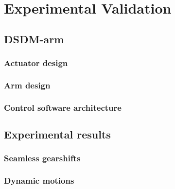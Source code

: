 \chapter{Experimental Validation}
\label{sec:ExperimentalValidation}


\section{DSDM-arm}
\label{sec:DSDMArm}

\subsection{Actuator design}
\label{sec:ActuatorDesign}

\subsection{Arm design}
\label{sec:ArmDesign}

\subsection{Control software architecture}
\label{sec:ControlSoftwareArchitecture}


\section{Experimental results}
\label{sec:ExperimentalResults}

\subsection{Seamless gearshifts}
\label{sec:SeamlessGearshifts}

\subsection{Dynamic motions}
\label{sec:DynamicMotions}


